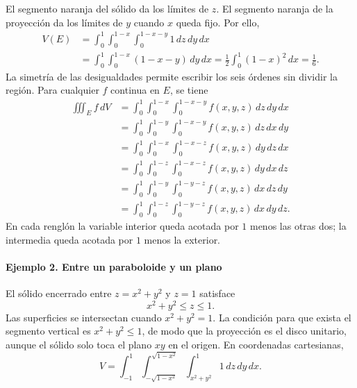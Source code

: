El segmento naranja del sólido da los límites de $z$. El segmento naranja de la proyección da los límites de $y$ cuando $x$ queda fijo. Por ello,
\begin{align*}
V(E)&=\int_0^1\int_0^{1-x}\int_0^{1-x-y}1\,dz\,dy\,dx\\
&=\int_0^1\int_0^{1-x}(1-x-y)\,dy\,dx
=\frac12\int_0^1(1-x)^2\,dx=\frac16.
\end{align*}
La simetría de las desigualdades permite escribir los seis órdenes sin dividir la región. Para cualquier $f$ continua en $E$, se tiene
\begin{align*}
\iiint_E f\,dV
&=\int_0^1\int_0^{1-x}\int_0^{1-x-y}f(x,y,z)\,dz\,dy\,dx\\
&=\int_0^1\int_0^{1-y}\int_0^{1-x-y}f(x,y,z)\,dz\,dx\,dy\\
&=\int_0^1\int_0^{1-x}\int_0^{1-x-z}f(x,y,z)\,dy\,dz\,dx\\
&=\int_0^1\int_0^{1-z}\int_0^{1-x-z}f(x,y,z)\,dy\,dx\,dz\\
&=\int_0^1\int_0^{1-y}\int_0^{1-y-z}f(x,y,z)\,dx\,dz\,dy\\
&=\int_0^1\int_0^{1-z}\int_0^{1-y-z}f(x,y,z)\,dx\,dy\,dz.
\end{align*}
En cada renglón la variable interior queda acotada por $1$ menos las otras dos; la intermedia queda acotada por $1$ menos la exterior.

\paragraph{Ejemplo 2. Entre un paraboloide y un plano}

El sólido encerrado entre $z=x^2+y^2$ y $z=1$ satisface
\[
x^2+y^2\leq z\leq1.
\]
Las superficies se intersectan cuando $x^2+y^2=1$. La condición para que exista el segmento vertical es $x^2+y^2\leq1$, de modo que la proyección es el disco unitario, aunque el sólido solo toca el plano $xy$ en el origen. En coordenadas cartesianas,
\[
V=\int_{-1}^1\int_{-\sqrt{1-x^2}}^{\sqrt{1-x^2}}
\int_{x^2+y^2}^{1}1\,dz\,dy\,dx.
\]

